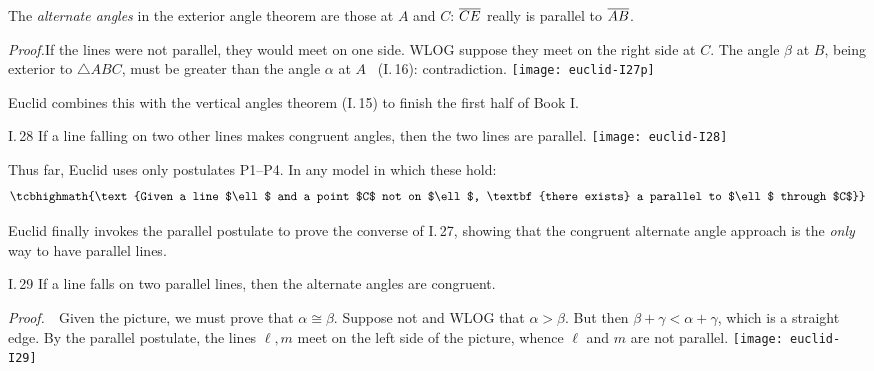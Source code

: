 The \emph{alternate angles} in the exterior angle theorem are those at $A$ and $C$: $\overline{CE}$ really is parallel to $\overline{AB}$.

\begin{tcolorbox}[proofstyle,lower separated=false, sidebyside, sidebyside align=top seam, sidebyside gap=0pt, righthand width=0.37\linewidth]
	\emph{Proof.}\lstsp If the lines were not parallel, they would meet on one side. WLOG suppose they meet on the right side at $C$.\smallbreak
	The angle $\beta$ at $B$, being exterior to $\triangle ABC$, must be greater than the angle $\alpha$ at $A$ \ (I.\,16): contradiction.
	\tcblower
	\flushright
	\texttt{[image: euclid-I27p]}\\[-12pt]\hfill\qedsymbol
\end{tcolorbox}

Euclid combines this with the vertical angles theorem (I.\,15) to finish the first half of Book I.

\begin{cor}[lower separated=false, sidebyside, sidebyside align=top seam, sidebyside gap=0pt, righthand width=0.32\linewidth]{I.\,28}{}
	If a line falling on two other lines makes congruent angles, then the two lines are parallel.
	\tcblower
	\flushright\texttt{[image: euclid-I28]}
\end{cor}


Thus far, Euclid uses only postulates P1--P4. In any model in which these hold:
\[
	\tcbhighmath{\text{Given a line $\ell$ and a point $C$ not on $\ell$, \textbf{there exists} a parallel to $\ell$ through $C$}}
\]
\goodbreak




Euclid finally invokes the parallel postulate to prove the converse of I.\,27, showing that the congruent alternate angle approach is the \emph{only} way to have parallel lines.

\begin{thm}{I.\,29}{}
	If a line falls on two parallel lines, then the alternate angles are congruent.
\end{thm}

\begin{tcolorbox}[proofstyle,lower separated=false, sidebyside, sidebyside align=top seam, sidebyside gap=0pt, righthand width=0.37\linewidth]
	\emph{Proof.}\ \ Given the picture, we must prove that $\alpha\cong\beta$.\smallbreak
	Suppose not and WLOG that $\alpha>\beta$.\smallbreak
	But then $\beta+\gamma<\alpha+\gamma$, which is a straight edge.\smallbreak
	By the parallel postulate, the lines $\ell,m$ meet on the left side of the picture, whence $\ell$ and $m$ are not parallel.
	\tcblower
	\flushright
	\texttt{[image: euclid-I29]}\\[-10pt]\qedsymbol
\end{tcolorbox}

